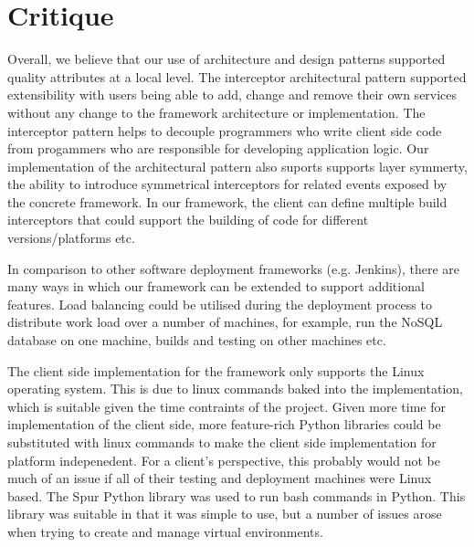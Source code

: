 \chapter{Critique}



Overall, we believe that our use of architecture and design patterns supported quality attributes at a local level. The interceptor architectural pattern supported extensibility with users being able to add, change and remove their own services without any change to the framework architecture or implementation. The interceptor pattern helps to decouple programmers who write client side code from progammers who are responsible for developing application logic. Our implementation of the architectural pattern also suports supports layer symmerty, the ability to introduce symmetrical interceptors for related events exposed by the concrete framework. In our framework, the client can define multiple build interceptors that could support the building of code for different versions/platforms etc.



In comparison to other software deployment frameworks (e.g. Jenkins), there are many ways in which our framework can be extended to support additional features. Load balancing could be utilised during the deployment process to distribute work load over a number of machines, for example, run the NoSQL database on one machine, builds and testing on other machines etc.


The client side implementation for the framework only supports the Linux operating system. This is due to linux commands baked into the implementation, which is suitable given the time contraints of the project. Given more time for implementation of the client side, more feature-rich Python libraries could be substituted with linux commands to make the client side implementation for platform indepenedent. For a client's perspective, this probably would not be much of an issue if all of their testing and deployment machines were Linux based. The Spur Python library was used to run bash commands in Python. This library was suitable in that it was simple to use, but a number of issues arose when trying to create and manage virtual environments.